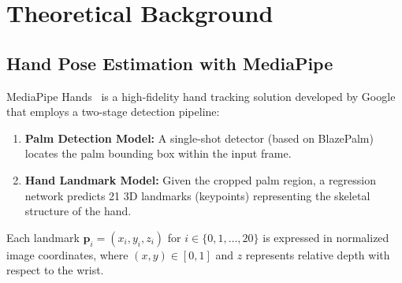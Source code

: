 \documentclass[12pt, a4paper]{article}
\begin{document}
\section{Theoretical Background}
\label{sec:theory}

\subsection{Hand Pose Estimation with MediaPipe}

MediaPipe Hands~\cite{mediapipe2020} is a high-fidelity hand tracking solution developed by Google that employs a two-stage detection pipeline:

\begin{enumerate}
    \item \textbf{Palm Detection Model:} A single-shot detector (based on BlazePalm) locates the palm bounding box within the input frame.
    \item \textbf{Hand Landmark Model:} Given the cropped palm region, a regression network predicts 21 3D landmarks (keypoints) representing the skeletal structure of the hand.
\end{enumerate}

Each landmark $\mathbf{p}_i = (x_i, y_i, z_i)$ for $i \in \{0, 1, \ldots, 20\}$ is expressed in normalized image coordinates, where $(x, y) \in [0, 1]$ and $z$ represents relative depth with respect to the wrist.
\end{document}
